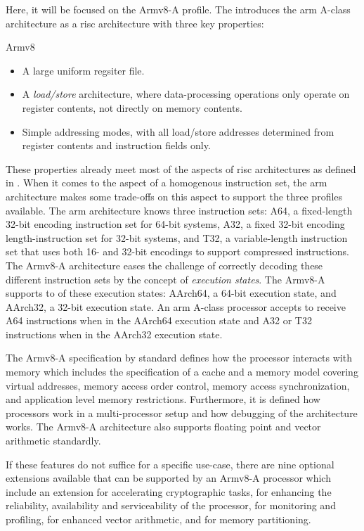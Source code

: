 Here, it will be focused on the Armv8-A profile.
The  \cite{Armv8} introduces the \gls{arm} A-class architecture as a \gls{risc} architecture with three key properties:
\begin{displaycquote}[p.A1-34]{Armv8}
    \begin{itemize}
        \item A large uniform regsiter file.
        \item A \textit{load/store} architecture, where data-processing operations only operate on register contents, not directly on memory contents.
        \item Simple addressing modes, with all load/store addresses determined from register contents and instruction fields only.
    \end{itemize}
\end{displaycquote}

These properties already meet most of the aspects of \gls{risc} architectures as defined in \cite{Hennessy12}.
When it comes to the aspect of a homogenous instruction set, the \gls{arm} architecture makes some trade-offs on this aspect to support the three profiles available.
The \gls{arm} architecture knows three instruction sets: A64, a fixed-length 32-bit encoding instruction set for 64-bit systems, A32, a fixed 32-bit encoding length-instruction set for 32-bit systems, and T32, a variable-length instruction set that uses both 16- and 32-bit encodings to support compressed instructions.
The Armv8-A architecture eases the challenge of correctly decoding these different instruction sets by the concept of \textit{execution states}.
The Armv8-A supports to of these execution states: AArch64, a 64-bit execution state, and AArch32, a 32-bit execution state.
An \gls{arm} A-class processor accepts to receive A64 instructions when in the AArch64 execution state and A32 or T32 instructions when in the AArch32 execution state.

The Armv8-A specification by standard defines how the processor interacts with memory which includes the specification of a cache and a memory model covering virtual addresses, memory access order control, memory access synchronization, and application level memory restrictions.
Furthermore, it is defined how processors work in a multi-processor setup and how debugging of the architecture works.
The Armv8-A architecture also supports floating point and vector arithmetic standardly.

If these features do not suffice for a specific use-case, there are nine optional extensions available that can be supported by an Armv8-A processor which include an extension for accelerating cryptographic tasks, for enhancing the reliability, availability and serviceability of the processor, for monitoring and profiling, for enhanced vector arithmetic, and for memory partitioning.

